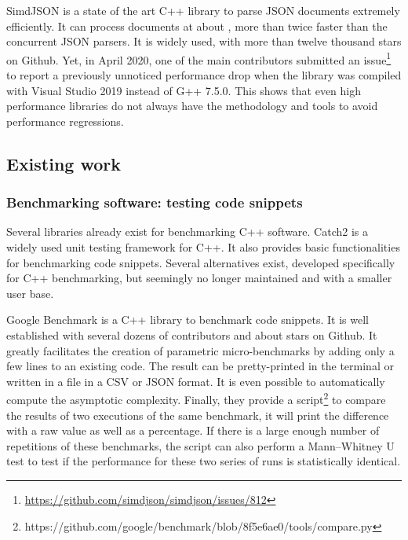             SimdJSON\cite{simdjson} is a state of the art C++ library to parse JSON documents extremely efficiently. It
            can process documents at about , more than twice faster than the concurrent
            JSON parsers. It is widely used, with more than twelve thousand stars on Github. Yet, in April 2020, one of
            the main contributors submitted an issue\footnote{\url{https://github.com/simdjson/simdjson/issues/812}} to
            report a previously unnoticed  performance drop when the library was compiled with Visual
            Studio 2019 instead of G++ 7.5.0. This shows that even high performance libraries do not always have the
            methodology and tools to avoid performance regressions.

        \subsection{Existing work}%
        \label{sub:existing_work}

            \subsubsection{Benchmarking software: testing code snippets}%

                Several libraries already exist for benchmarking C++ software. Catch2\cite{catch2} is a widely used unit
                testing framework for C++. It also provides basic functionalities for benchmarking code snippets.
                Several alternatives exist, developed specifically for C++ benchmarking\cite{celero,hayai,nonius}, but
                seemingly no longer maintained and with a smaller user base.

                Google Benchmark\cite{google-benchmark} is a C++ library to benchmark code snippets. It is well
                established with several dozens of contributors and about  stars on Github. It greatly
                facilitates the creation of parametric micro-benchmarks by adding only a few lines to an existing code.
                The result can be pretty-printed in the terminal or written in a file in a CSV or JSON format. It is
                even possible to automatically compute the asymptotic complexity. Finally, they provide a
                script\footnote{https://github.com/google/benchmark/blob/8f5e6ae0/tools/compare.py} to compare the
                results of two executions of the same benchmark, it will print the difference with a raw value as well
                as a percentage.  If there is a large enough number of repetitions of these benchmarks, the script can
                also perform a Mann–Whitney U test to test if the performance for these two series of runs is
                statistically identical.


